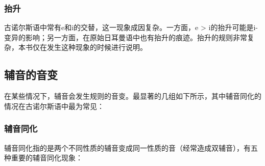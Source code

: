 \subsubsection{抬升}
\label{抬升}

古诺尔斯语中常有e和i的交替，这一现象成因复杂。一方面，e > i的抬升可能是i-变异的影响；另一方面，在原始日耳曼语中也有抬升的痕迹。抬升的规则非常复杂，本书仅在发生这种现象的时候进行说明。

\subsection{辅音的音变}
\label{辅音的音变}

在某些情况下，辅音会发生规则的音变。最显著的几组如下所示，其中辅音同化的情况在古诺尔斯语中最为常见：

\subsubsection{辅音同化}
\label{辅音同化}

辅音同化指的是两个不同性质的辅音变成同一性质的音（经常造成双辅音），有五种重要的辅音同化现象：

